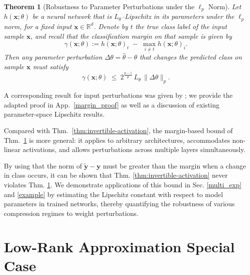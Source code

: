 \documentclass{article}
\theoremstyle{plain}
\newtheorem{theorem}{Theorem}[section]
\theoremstyle{definition}
\theoremstyle{remark}
\begin{document}

\begin{theorem}[Robustness to Parameter Perturbations under the $\ell_p$ Norm]\label{robustness}
Let $h(\mathbf x;\theta)$ be a neural network that is $L_\theta$--Lipschitz in its parameters under the $\ell_p$ norm, for a fixed input $\mathbf x\in\mathbb{R}^d$.  
Denote by $t$ the true class label of the input sample $\mathbf x$, and recall that the classification margin on that sample is given by
\[
\gamma(\mathbf x;\theta)
:=h(\mathbf x;\theta)_{t}\;-\;\max_{i\neq t}h(\mathbf x;\theta)_{i}.
\]
Then any parameter perturbation $\Delta\theta = \hat{\theta} - \theta$ that changes the predicted class on sample $\mathbf x$ must satisfy
\begin{equation}\label{margin_eqn1}
   \gamma(\mathbf x;\theta)
\;\le\;
2^{\frac{p-1}{p}}\,L_\theta\,\|\Delta\theta\|_p. 
\end{equation}
\end{theorem}

A corresponding result for input perturbations was given by \citet{li_preventing_2019};  
we provide the adapted proof in App.~\ref{margin_proof} as well as a discussion of existing parameter-space Lipschitz results.  

Compared with Thm.~\ref{thm:invertible-activation}, the margin-based bound  of Thm.~\ref{robustness} is more general: it applies to arbitrary architectures, accommodates non-linear activations, and allows perturbations across multiple layers simultaneously.

By using that the norm of $\tilde{\mathbf y} - \textbf{y}$ must be greater than the margin when a change in class occurs, it can be shown that Thm. \ref{thm:invertible-activation} never violates Thm. \ref{robustness}. 
We demonstrate applications of this bound in Sec. \ref{multi_exp} and \ref{example} by estimating the Lipschitz constant with respect to model parameters in trained networks, thereby quantifying the robustness of various compression regimes to weight perturbations.



\section{Low-Rank Approximation Special Case}\label{sec_lr}
\end{document}
